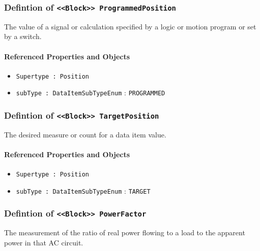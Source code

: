 \subsubsection{Defintion of \texttt{<<Block>> ProgrammedPosition}}
  \label{type:ProgrammedPosition}

\FloatBarrier

The value of a signal or calculation specified by a logic or motion program or set by a switch.

\FloatBarrier
\paragraph{Referenced Properties and Objects}

\begin{itemize}
\item \texttt{Supertype : Position}

\item \texttt{subType : DataItemSubTypeEnum} : \texttt{PROGRAMMED}

\end{itemize}
\FloatBarrier
\subsubsection{Defintion of \texttt{<<Block>> TargetPosition}}
  \label{type:TargetPosition}

\FloatBarrier

The desired measure or count for a data item value.

\FloatBarrier
\paragraph{Referenced Properties and Objects}

\begin{itemize}
\item \texttt{Supertype : Position}

\item \texttt{subType : DataItemSubTypeEnum} : \texttt{TARGET}

\end{itemize}
\FloatBarrier
\subsubsection{Defintion of \texttt{<<Block>> PowerFactor}}
  \label{type:PowerFactor}

\FloatBarrier

The measurement of the ratio of real power flowing to a load to the apparent power in that AC circuit.

